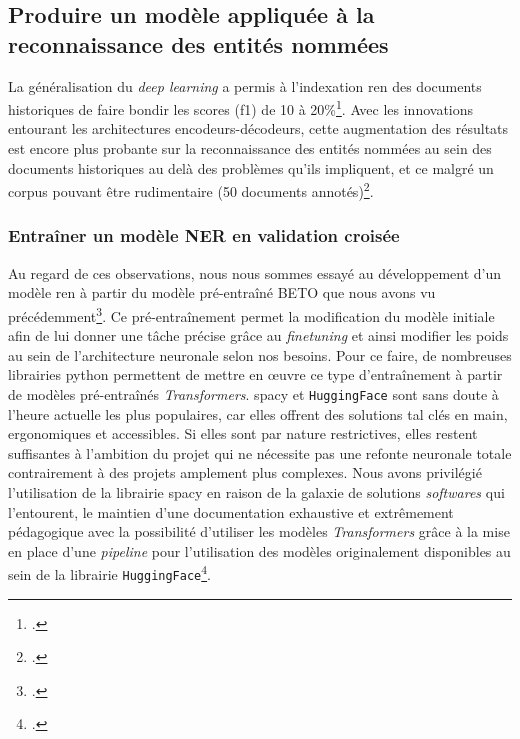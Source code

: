 	\subsection{Produire un modèle appliquée à la reconnaissance des entités nommées}
	
	La généralisation du \textit{deep learning} a permis à l'indexation \gls{ren} des documents historiques de faire bondir les scores (\gls{f1}) de 10 à 20\%\footcite{ehrmannNamedEntityRecognition2021}. Avec les innovations entourant les architectures encodeurs-décodeurs, cette augmentation des résultats est encore plus probante sur la reconnaissance des entités nommées au sein des documents historiques au delà des problèmes qu'ils impliquent, et ce malgré un corpus pouvant être rudimentaire (50 documents annotés)\footcite{abadieBenchmarkNamedEntity2022}.
	
	\subsubsection{Entraîner un modèle NER en validation croisée}
	
	Au regard de ces observations, nous nous sommes essayé au développement d'un modèle \gls{ren} à partir du modèle pré-entraîné BETO que nous avons vu précédemment\footcite{caneteSpanishPreTrainedBERT2020}. Ce pré-entraînement permet la modification du modèle initiale afin de lui donner une tâche précise grâce au \textit{finetuning} et ainsi modifier les poids au sein de l'architecture neuronale selon nos besoins. Pour ce faire, de nombreuses librairies python permettent de mettre en œuvre ce type d'entraînement à partir de modèles pré-entraînés \textit{Transformers}. \gls{spacy} et \texttt{HuggingFace} sont sans doute à l'heure actuelle les plus populaires, car elles offrent des solutions \gls{tal} clés en main, ergonomiques et accessibles. Si elles sont par nature restrictives, elles restent suffisantes à l'ambition du projet qui ne nécessite pas une refonte neuronale totale contrairement à des projets amplement plus complexes. Nous avons privilégié l'utilisation de la librairie \gls{spacy} en raison de la galaxie de solutions \textit{softwares} qui l'entourent, le maintien d'une documentation exhaustive et extrêmement pédagogique avec la possibilité d'utiliser les modèles \textit{Transformers} grâce à la mise en place d'une \textit{pipeline} pour l'utilisation des modèles originalement disponibles au sein de la librairie \texttt{HuggingFace}\footcite{SpacytransformersUsePretrained2022}.
	
